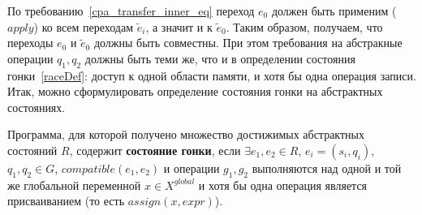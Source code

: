 По требованию~\ref{cpa_transfer_inner_eq} переход $e_0$ должен быть применим ($apply$) ко всем переходам $\tilde{e}_i$, а значит и к $\tilde{e}_0$.
Таким образом, получаем, что переходы $e_0$ и $\tilde{e}_0$ должны быть совместны.
При этом требования на абстракные операции $q_1, q_2$ должны быть теми же, что и в определении состояния гонки~\ref{raceDef}: доступ к одной области памяти, и хотя бы одна операция записи.
Итак, можно сформулировать определение состояния гонки на абстрактных состояниях.

\begin{defn}
\label{raceDef_abstract}
Программа, для которой получено множество достижимых абстрактных состояний $R$, содержит \textbf{состояние гонки}, если $\exists e_1, e_2 \in R$, $e_i=(s_i,q_i)$, $q_1, q_2 \in G$, $compatible(e_1, e_2)$ и операции $g_1, g_2$ выполняются над одной и той же глобальной переменной $x \in X^{global}$ и хотя бы одна операция является присваиванием (то есть $assign(x, expr)$).
\end{defn}


